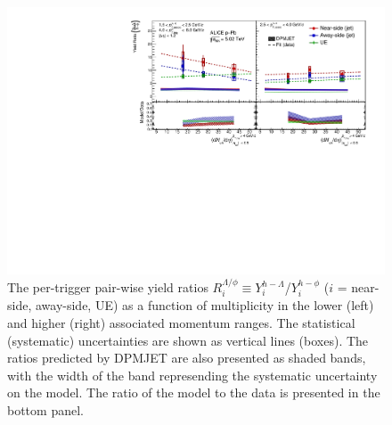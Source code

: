 \begin{figure}[ht]
\centering
\includegraphics[width=\textwidth]{figures/results/final_lambda_phi_ratio_plot_new_x_axis_model_ratio.pdf}
\caption{The per-trigger pair-wise yield ratios $R_{i}^{\Lambda/\phi} \equiv Y_{i}^{h-\Lambda}$/$Y_{i}^{h-\phi}$ ($i$ = near-side, away-side, UE) as a function of multiplicity in the lower (left) and higher (right) associated momentum ranges. The statistical (systematic) uncertainties are shown as vertical lines (boxes).  The ratios predicted by DPMJET are also presented as shaded bands, with the width of the band represending the systematic uncertainty on the model. The ratio of the model to the data is presented in the bottom panel.}
\label{fig:lambda_phi_ratio}
\end{figure}

